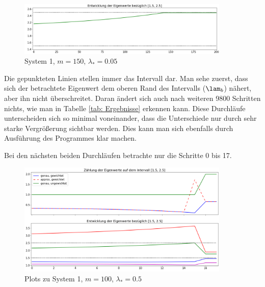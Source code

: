 \documentclass[a4paper,12pt]{report}
\newcommand{\1}{\mathds{1}}
\theoremstyle{plain} %
\theoremstyle{definition} %
\theoremstyle{remark}
\begin{document}
            \begin{figure}[h!t]
                  \centering
                  \includegraphics[width=0.9\textwidth, keepaspectratio]{./Original/Plot_1_150_0.05.png}
                  \caption{System 1, $m=150$, $\lambda_*=0.05$}
                  \label{fig: Plot_1_150_0.05}
            \end{figure}

            Die gepunkteten Linien stellen immer das Intervall \lamAlamB dar.
            Man sehe zuerst, dass sich der betrachtete Eigenwert dem oberen Rand des Intervalls ($\lam_b$) nähert, aber ihn nicht überschreitet.
            Daran ändert sich auch nach weiteren 9800 Schritten nichts, wie man in Tabelle \ref{tab: Ergebnisse} erkennen kann.
            Diese Durchläufe unterscheiden sich so minimal voneinander, dass die Unterschiede nur durch sehr starke Vergrößerung sichtbar werden.
            Dies kann man sich ebenfalls durch Ausführung des Programmes klar machen.

            Bei den nächsten beiden Durchläufen betrachte nur die Schritte 0 bis 17. 

            \begin{figure}[h!t]
                  \centering
                  \includegraphics[width=0.9\textwidth, keepaspectratio]{./Original/Plot_1_100_0.5.png}
                  \caption{Plots zu System 1, $m=100$, $\lambda_*=0.5$}
                  \label{fig: Plot_1_100_0.5}
            \end{figure}
\end{document}
